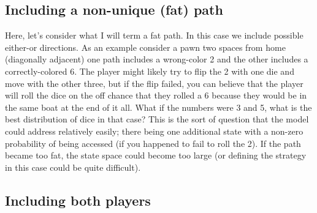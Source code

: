 \documentclass[letterpaper]{article}
\begin{document}
\subsection{Including a non-unique (fat) path}
Here, let's consider what I will term a fat path.  In this case we include
possible either-or directions.  As an example consider a pawn two spaces from
home (diagonally adjacent) one path includes a wrong-color 2 and the other
includes a correctly-colored 6.  The player might likely try to flip the 2 with
one die and move with the other three, but if the flip failed, you can believe
that the player will roll the dice on the off chance that they rolled a 6
because they would be in the same boat at the end of it all.  What if the
numbers were 3 and 5, what is the best distribution of dice in that case?
This is the sort of question that the model could address relatively easily;
there being one additional state with a non-zero probability of being accessed
(if you happened to fail to roll the 2).  If the path became too fat, the state
space could become too large (or defining the strategy in this case could be
quite difficult).

\subsection{Including both players}
\end{document}
